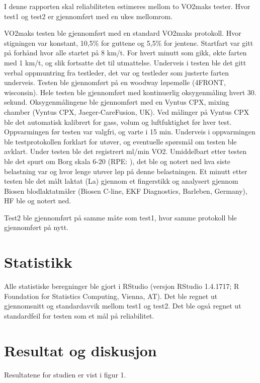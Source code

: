 \documentclass[
]{book}
\begin{document}
I denne rapporten skal reliabiliteten estimeres mellom to VO2maks tester. Hvor test1 og test2 er gjennomført med en ukes mellomrom.

VO2maks testen ble gjennomført med en standard VO2maks protokoll. Hvor stigningen var konstant, 10,5\% for guttene og 5,5\% for jentene. Startfart var gitt på forhånd hvor alle startet på 8 km/t. For hvert minutt som gikk, økte farten med 1 km/t, og slik fortsatte det til utmattelse. Underveis i testen ble det gitt verbal oppmuntring fra testleder, det var og testleder som justerte farten underveis. Testen ble gjennomført på en woodway løpemølle (4FRONT, wisconsin). Hele testen ble gjennomført med kontinuerlig oksygenmåling hvert 30. sekund. Oksygenmålingene ble gjennomført med en Vyntus CPX, mixing chamber (Vyntus CPX, Jaeger-CareFusion, UK). Ved målinger på Vyntus CPX ble det automatisk kalibrert for gass, volum og luftfuktighet før hver test. Oppvarmingen før testen var valgfri, og varte i 15 min. Underveis i oppvarmingen ble testprotokollen forklart for utøver, og eventuelle spørsmål om testen ble avklart. Under testen ble det registrert ml/min VO2. Umiddelbart etter testen ble det spurt om Borg skala 6-20 (RPE: \citet{borg1970} ), det ble og notert ned hva siste belastning var og hvor lenge utøver løp på denne belastningen. Et minutt etter testen ble det målt laktat (La) gjennom et fingerstikk og analysert gjennom Biosen blodlaktatmåler (Biosen C-line, EKF Diagnostics, Barleben, Germany), HF ble og notert ned.

Test2 ble gjennomført på samme måte som test1, hvor samme protokoll ble gjennomført på nytt.

\hypertarget{statistikk}{%
\section{Statistikk}\label{statistikk}}

Alle statistiske beregninger ble gjort i RStudio (versjon RStudio 1.4.1717; R Foundation for Statistics Computing, Vienna, AT). Det ble regnet ut gjennomsnitt og standardavvik mellom test1 og test2. Det ble også regnet ut standardfeil for testen som et mål på reliabilitet.

\hypertarget{resultat-og-diskusjon}{%
\section{Resultat og diskusjon}\label{resultat-og-diskusjon}}

Resultatene for studien er vist i figur 1.
\end{document}

